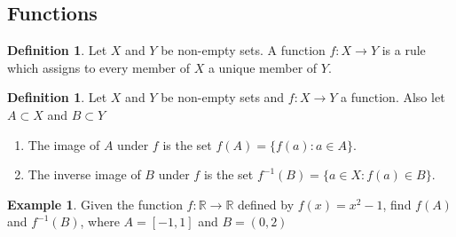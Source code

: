 \documentclass[11pt,a4paper]{article}
\theoremstyle{definition}
\newtheorem{defn}[thm]{Definition}
\newtheorem{exa}[thm]{Example}
\begin{document}
\subsection{Functions}
\begin{defn}
Let $X$ and $Y$ be non-empty sets. A function $f:X\longrightarrow Y$ is a rule which assigns to every member of $X$ a unique member of $Y$.
\end{defn}
\begin{defn}
Let $X$ and $Y$ be non-empty sets and $f:X\longrightarrow Y$ a function. Also let $A\subset X$ and $B\subset Y$
\begin{enumerate}
\item The image of $A$ under $f$ is the set $f(A)=\{f(a):a\in A\}$.
\item The inverse image of $B$ under $f$ is the set $f^{-1}(B)=\{a\in X:f(a)\in B\}$.
\end{enumerate}
\end{defn}
\begin{exa}
Given the function $f:\mathbb{R}\longrightarrow \mathbb{R}$ defined by $f(x)=x^2-1$, find $f(A)$ and $f^{-1}(B)$, where $A=[-1,1]$ and $B=(0,2)$
\end{exa}
\end{document}
